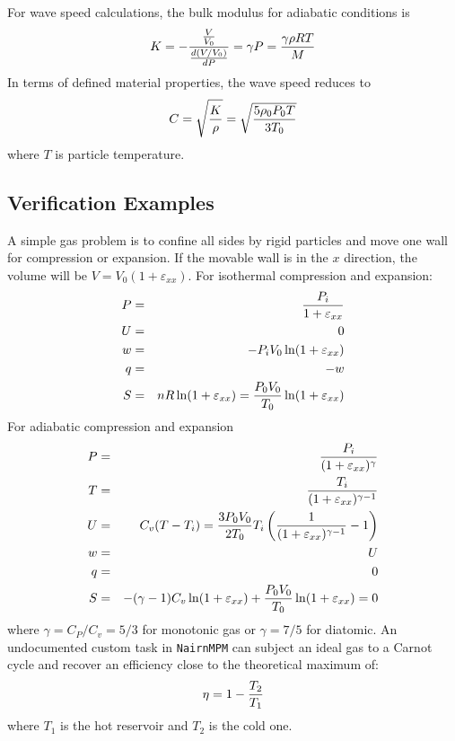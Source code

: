 \documentclass[11pt]{book}
\def\e#1{\varepsilon_{#1}}
\begin{document}
For wave speed calculations, the bulk modulus for adiabatic conditions is
\begin{equation}
   K = -{{V\over V_0} \over {d(V/V_0)\over dP}} = \gamma P = {\gamma\rho R T\over M}
\end{equation}
In terms of defined material properties, the wave speed reduces to
\begin{equation}
   C = \sqrt{K\over\rho} = \sqrt{{5\rho_0P_0T\over 3T_0}}
\end{equation}
where $T$ is particle temperature.


\subsection{Verification Examples}

A simple gas problem is to confine all sides by rigid particles and move one wall for compression or expansion. If the movable wall is in the $x$ direction, the volume will be $V = V_0(1+\e{xx})$. For isothermal compression and expansion:
\begin{eqnarray}
    P & = & {P_i\over 1+\e{xx}} \\
    U & = & 0 \\
    w & = & -P_iV_0\ln(1+\e{xx}) \\
    q & = & -w \\
    S & = & nR\ln(1+\e{xx}) = {P_0 V_0\over T_0}\ln(1+\e{xx})
\end{eqnarray}
For adiabatic compression and expansion
\begin{eqnarray}
    P & = & {P_i\over (1+\e{xx})^\gamma} \\
    T & = & {T_i\over (1+\e{xx})^{\gamma-1}} \\
    U & = & C_v(T - T_i) 
               = {3P_0V_0\over 2T_0}T_i\left({1\over (1+\e{xx})^{\gamma-1}}-1\right) \\
    w & = & U \\
    q & = & 0 \\
    S & = & -(\gamma-1)C_v\ln(1+\e{xx}) + {P_0 V_0\over T_0}\ln(1+\e{xx}) = 0
\end{eqnarray}
where $\gamma=C_P/C_v=5/3$ for monotonic gas or $\gamma=7/5$ for diatomic. An undocumented custom task in {\tt NairnMPM} can subject an ideal gas to a Carnot cycle and recover an efficiency close to the theoretical maximum of:
\begin{equation}
       \eta = 1 - {T_2\over T_1}
\end{equation}
where $T_1$ is the hot reservoir and $T_2$ is the cold one.
\end{document}
